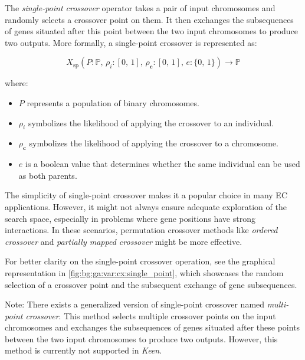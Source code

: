 \begin{definition}
    The \textit{single-point crossover} operator takes a pair of input chromosomes and randomly selects a crossover point 
    on them. It then exchanges the subsequences of genes situated after this point between the two input chromosomes to 
    produce two outputs. More formally, a single-point crossover is represented as:

    \begin{equation}
        X_\mathrm{sp}(P: \mathbb{P},\, \rho_i: [0,\, 1],\, \rho_\mathbf{c}: [0,\, 1],\, e: \{0,\, 1\}) \to \mathbb{P}
    \end{equation}

    where:

    \begin{itemize}
        \item \(P\) represents a population of binary chromosomes.
        \item \(\rho_i\) symbolizes the likelihood of applying the crossover to 
            an individual.
        \item \(\rho_\mathbf{c}\) symbolizes the likelihood of applying the 
            crossover to a chromosome.
        \item \(e\) is a boolean value that determines whether the same individual can be used as both parents.
    \end{itemize}
\end{definition}

\begin{remark}
    The simplicity of single-point crossover makes it a popular choice in many EC applications. However, it might not 
    always ensure adequate exploration of the search space, especially in problems where gene positions have strong 
    interactions. In these scenarios, permutation crossover methods like \textit{ordered crossover} and 
    \textit{partially mapped crossover} might be more effective.
\end{remark}

For better clarity on the single-point crossover operation, see the graphical 
representation in \vref{fig:bg:ga:var:cx:single_point}, which showcases the 
random selection of a crossover point and the subsequent exchange of gene 
subsequences.

Note: There exists a generalized version of single-point crossover named 
\textit{multi-point crossover}. This method selects multiple crossover points 
on the input chromosomes and exchanges the subsequences of genes situated 
after these points between the two input chromosomes to produce two 
outputs. However, this method is currently not supported in \textit{Keen}.
